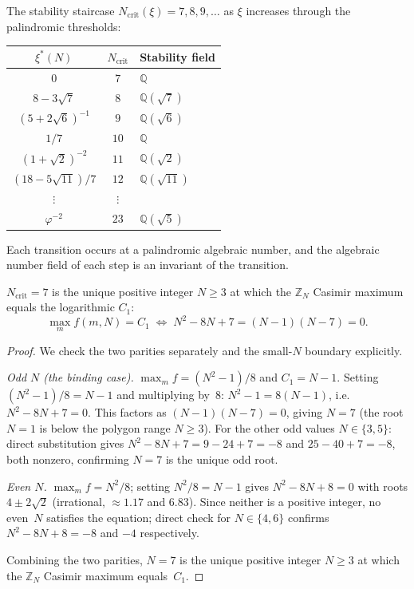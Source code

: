 The stability staircase $N_{\mathrm{crit}}(\xi) = 7, 8, 9, \ldots$
as $\xi$ increases through the palindromic thresholds:
\begin{center}
\small
\begin{tabular}{ccl}
\toprule
$\xi^*(N)$ & $N_{\mathrm{crit}}$ &
  Stability field \\
\midrule
$0$ & $7$ & $\mathbb{Q}$ \\
$8{-}3\sqrt{7}$ & $8$ & $\mathbb{Q}(\sqrt{7})$ \\
$(5{+}2\sqrt{6})^{-1}$ & $9$ & $\mathbb{Q}(\sqrt{6})$ \\
$1/7$ & $10$ & $\mathbb{Q}$ \\
$(1{+}\sqrt{2})^{-2}$ & $11$ & $\mathbb{Q}(\sqrt{2})$ \\
$(18{-}5\sqrt{11})/7$ & $12$ & $\mathbb{Q}(\sqrt{11})$ \\
\multicolumn{1}{c}{$\vdots$} & $\vdots$ & \\
$\varphi^{-2}$ & $23$ &
  $\mathbb{Q}(\sqrt{5})$ \\
\bottomrule
\end{tabular}
\end{center}
Each transition occurs at a palindromic algebraic number,
and the algebraic number field of each step is an invariant
of the transition.

\begin{theorem}[Algebraic origin of $N_{\mathrm{crit}} = 7$]
\label{thm:why-7-algebraic}
$N_{\mathrm{crit}} = 7$ is the unique positive integer $N \ge 3$ at
which the $\mathbb{Z}_N$ Casimir maximum equals the logarithmic $C_1$:
\begin{equation}\label{eq:n-crit-factorization}
  \max_m f(m,N) = C_1
  \;\Longleftrightarrow\;
  N^2 - 8N + 7 = (N-1)(N-7) = 0.
\end{equation}
\end{theorem}

\begin{proof}
We check the two parities separately and the small-$N$
boundary explicitly.

\emph{Odd $N$ (the binding case).}
$\max_m f = (N^2{-}1)/8$ and $C_1 = N{-}1$.  Setting
$(N^2{-}1)/8 = N{-}1$ and multiplying by~$8$:
$N^2 - 1 = 8(N{-}1)$, i.e.\ $N^2 - 8N + 7 = 0$.
This factors as $(N{-}1)(N{-}7) = 0$, giving $N = 7$
(the root $N = 1$ is below the polygon range $N \ge 3$).
For the other odd values $N \in \{3, 5\}$: direct
substitution gives $N^2 - 8N + 7 = 9 - 24 + 7 = -8$
and $25 - 40 + 7 = -8$, both nonzero, confirming
$N = 7$ is the unique odd root.

\emph{Even $N$.}
$\max_m f = N^2/8$; setting $N^2/8 = N{-}1$ gives
$N^2 - 8N + 8 = 0$ with roots $4 \pm 2\sqrt{2}$
(irrational, $\approx 1.17$ and $6.83$).  Since
neither is a positive integer, no even~$N$ satisfies
the equation; direct check for $N \in \{4, 6\}$
confirms $N^2 - 8N + 8 = -8$ and $-4$ respectively.

Combining the two parities, $N = 7$ is the unique
positive integer $N \ge 3$ at which the $\mathbb{Z}_N$
Casimir maximum equals~$C_1$.
\end{proof}

